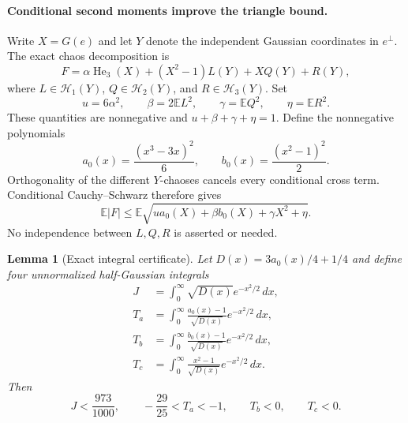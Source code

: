 \documentclass[11pt]{article}
\newtheorem{lemma}{Lemma}
\newcommand{\E}{\mathbb E}
\newcommand{\He}{\operatorname{He}}
\begin{document}
\paragraph{Conditional second moments improve the triangle bound.}
Write $X=G(e)$ and let $Y$ denote the independent Gaussian coordinates in
$e^\perp$. The exact chaos decomposition is
\[
 F=\alpha\He_3(X)+(X^2-1)L(Y)+XQ(Y)+R(Y),
\]
where $L\in\mathcal H_1(Y)$, $Q\in\mathcal H_2(Y)$, and
$R\in\mathcal H_3(Y)$. Set
\[
 u=6\alpha^2,\qquad\beta=2\E L^2,\qquad\gamma=\E Q^2,
 \qquad\eta=\E R^2.
\]
These quantities are nonnegative and $u+\beta+\gamma+\eta=1$.
Define the nonnegative polynomials
\[
 a_0(x)=\frac{(x^3-3x)^2}{6},\qquad
 b_0(x)=\frac{(x^2-1)^2}{2}.
\]
Orthogonality of the different $Y$-chaoses cancels every conditional cross
term. Conditional Cauchy--Schwarz therefore gives
\begin{equation}\label{eq:jensen}
 \E|F|\leq\E\sqrt{u a_0(X)+\beta b_0(X)+\gamma X^2+\eta}.
\end{equation}
No independence between $L,Q,R$ is asserted or needed.

\begin{lemma}[Exact integral certificate]\label{lem:certificate}
Let $D(x)=3a_0(x)/4+1/4$ and define four unnormalized half-Gaussian integrals
\begin{align*}
 J&=\int_0^\infty\sqrt{D(x)}e^{-x^2/2}\,dx,\\
 T_a&=\int_0^\infty\frac{a_0(x)-1}{\sqrt{D(x)}}e^{-x^2/2}\,dx,\\
 T_b&=\int_0^\infty\frac{b_0(x)-1}{\sqrt{D(x)}}e^{-x^2/2}\,dx,\\
 T_c&=\int_0^\infty\frac{x^2-1}{\sqrt{D(x)}}e^{-x^2/2}\,dx.
\end{align*}
Then
\[
 J<\frac{973}{1000},\qquad
 -\frac{29}{25}<T_a<-1,\qquad T_b<0,\qquad T_c<0.
\]
\end{lemma}
\end{document}
